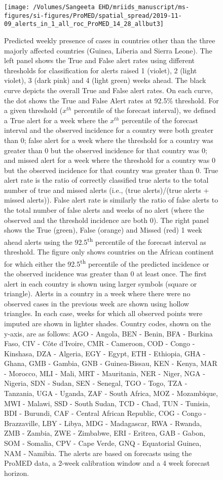 \documentclass[9pt,twoside,lineno]{pnas-new}
\begin{document}
\begin{figure}
\centering
\texttt{[image: /Volumes/Sangeeta EHD/mriids\_manuscript/ms-figures/si-figures/ProMED/spatial\_spread/2019-11-09\_alerts\_in\_1\_all\_roc\_ProMED\_14\_28\_allbut3]}
\caption{Predicted weekly presence of cases in
countries other than the three majorly affected countries (Guinea,
Liberia and Sierra Leone). The left panel shows the True and False alert rates using
different thresholds for classification for alerts raised 1 (violet), 2
(light violet), 3 (dark pink) and 4 (light green) weeks ahead. The
black curve depicts the overall True and False alert rates. On each
curve, the dot shows the True and False Alert rates at 92.5\% threshold.
For a given threshold (\(x^{th}\)
percentile of the forecast interval), we defined a True alert for a week
where the \(x^{th}\) percentile of the forecast interval and the
observed incidence for a country were both greater than 0; false alert
for a week where the threshold for a country was greater than 0 but the
observed incidence for that country was 0; and missed alert for a week where
the threshold for a country was 0 but the observed incidence for that
country was greater than 0. True alert rate is the ratio of correctly
classified true alerts to the total number of true and missed alerts
(i.e., (true alerts)/(true alerts + missed alerts)). False alert rate is
similarly the ratio of false alerts to the total number of false alerts
and weeks of no alert (where the observed and the threshold incidence
are both 0). The right panel shows the True (green), False (orange) and
Missed (red) 1 week ahead alerts using the 92.5\textsuperscript{th} percentile of the
forecast interval as threshold. 
The figure only shows countries on the
African continent for which either the 92.5\textsuperscript{th}
percentile of the predicted incidence or the
observed incidence was greater than 0 at least once. 
The first alert in each country is shown
using larger symbols (square or triangle). Alerts in a country in a
week where there were no observed cases in the previous week are shown
using hollow triangles. In each case, weeks for which all observed points
were imputed are shown in lighter shades.
Country codes, shown on the y-axis, are as
follows: AGO - Angola, BEN - Benin, BFA - Burkina Faso, CIV - Côte
d’Ivoire, CMR - Cameroon, COD - Congo - Kinshasa, DZA - Algeria, EGY -
Egypt, ETH - Ethiopia, GHA - Ghana, GMB - Gambia, GNB - Guinea-Bissau,
KEN - Kenya, MAR - Morocco, MLI - Mali, MRT - Mauritania, NER - Niger,
NGA - Nigeria, SDN - Sudan, SEN - Senegal, TGO - Togo, TZA - Tanzania,
UGA - Uganda, ZAF - South Africa, MOZ - Mozambique, MWI - Malawi, SSD
- South Sudan, TCD - Chad, TUN - Tunisia, BDI - Burundi, CAF - Central
African Republic, COG - Congo - Brazzaville, LBY - Libya, MDG -
Madagascar, RWA - Rwanda, ZMB - Zambia, ZWE - Zimbabwe, ERI - Eritrea,
GAB - Gabon, SOM - Somalia, CPV - Cape Verde, GNQ - Equatorial Guinea,
NAM - Namibia. The alerts are based on forecasts 
using the ProMED data, a 2-week calibration window and a 4 week
forecast horizon.}
\label{fig:alertsallbut3}
\end{figure}\FloatBarrier
\end{document}
